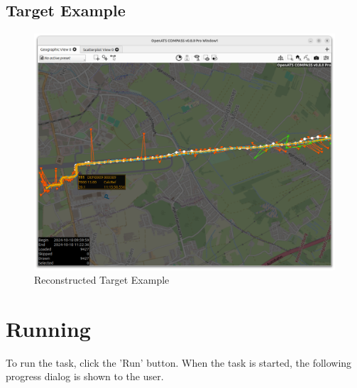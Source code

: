 \begin{itemize}
\subsection{Target Example}

\begin{figure}[H]
    \hspace*{-2.5cm}
    \includegraphics[width=19cm]{figures/target_ex1.png}
  \caption{Reconstructed Target Example}
\end{figure} 

\section{Running}

To run the task, click the 'Run' button. When the task is started, the following progress dialog is shown to the user.


\end{itemize}
